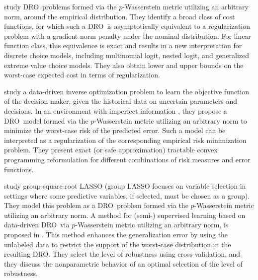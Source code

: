 \documentclass[final,onefignum,onetabnum]{class}
\newcommand{\dro}{DRO}
\begin{document}
\citet{gao2017}  study \dro\ problems formed via  the $p$-Wasserstein metric utilizing an arbitrary norm,  around the empirical  distribution. They  identify a broad class of cost functions, for which  such a  \dro\ is asymptotically
equivalent to a regularization problem with a gradient-norm penalty under the nominal distribution. For linear function class, this equivalence is exact and results in a new interpretation  for discrete
choice models, including multinomial logit, nested logit, and generalized extreme value choice models. %
They also obtain lower and upper bounds on the worst-case expected cost in terms of regularization. 

\citet{mohajerinesfahani2018inverse} study a data-driven inverse optimization  problem to learn the objective function of the decision maker, given the  historical  data on uncertain parameters and decisions. In an environment with imperfect information%
, they propose a \dro\ model formed via the $p$-Wasserstein metric utilizing an arbitrary norm to minimize the worst-case risk of the predicted error. Such a model  can be interpreted as a regularization of the corresponding empirical risk minimization problem. They present  exact (or safe approximation) tractable convex programming reformulation for different combinations of risk measures and error functions. 


\citet{blanchet2017groupwise} study group-square-root LASSO (group LASSO  focuses on variable selection in settings where some predictive variables, if selected, must be chosen as a group). They model this problem as a \dro\ problem formed via   the $p$-Wasserstein metric utilizing an arbitrary norm. 
A  method for (semi-) supervised learning  based on data-driven \dro\ via $p$-Wasserstein metric utilizing an arbitrary norm, is proposed in \citet{blanchet2017Semi}. This method  enhances the generalization error by using the unlabeled data to restrict the support of the worst-case distribution in the resulting \dro. %
They select the level of robustness using cross-validation, and they discuss the nonparametric behavior of an optimal selection of the level of robustness. 
\end{document}
